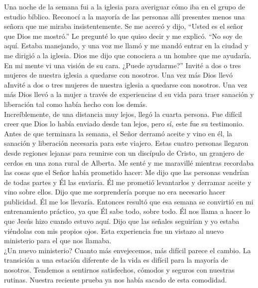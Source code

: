 \documentclass[twoside, 12pt]{book}
\begin{document}
Una noche de la semana fui a la iglesia para averiguar cómo iba en el grupo de estudio bíblico.  Reconocí a la mayoría de las personas allí presentes menos una señora que me miraba insistentemente. Se me acercó y dijo, “Usted es el señor que Dios me mostró.”  Le pregunté lo que quiso decir y me explicó. “No soy de aquí.  Estaba manejando, y una voz me llamó y me mandó entrar en la ciudad y me dirigió a la iglesia.  Dios me dijo que conociera a un hombre que me ayudaría. En mi mente vi una visión de su cara.  ¿Puede ayudarme?”
Invité a dos o tres mujeres de nuestra iglesia a quedarse con nosotros.  Una vez más Dios llevó aInvité a dos o tres mujeres de nuestra iglesia a quedarse con nosotros.  Una vez más Dios llevó a la mujer a través de experiencias d su vida para traer sanación y liberación tal como había hecho con los demás.\\

Increíblemente, de una distancia muy lejos, llegó la cuarta persona. Fue difícil creer que Dios lo había enviado desde tan lejos, pero sí, este fue su testimonio.  Antes de que terminara la semana, el Señor derramó aceite y vino en él, la sanación y liberación necesaria para este viajero.  Estas cuatro personas llegaron desde regiones lejanas para reunirse con un discípulo de Cristo, un granjero de cerdos en una zona rural de Alberta.
Me senté y me maravillé mientras recordaba las cosas que el Señor había prometido hacer: Me dijo que las personas vendrían de todas partes y Él las enviaría.  Él me prometió levantarlos y derramar aceite y vino sobre ellos.  Dijo que me sorprendería porque no era necesario hacer publicidad.  Él me los llevaría.  Entonces resultó que esa semana se convirtió en mi entrenamiento práctico, ya que Él sabe todo, sobre todo.  Él nos llama a hacer lo que Jesús hizo cuando estuvo aquí.  Dijo que las señales seguirían y yo estaba viéndolas con mis propios ojos.  Esta experiencia fue un vistazo al nuevo ministerio para el que nos llamaba.\\

¿Un nuevo ministerio? Cuanto más envejecemos, más difícil parece el cambio.  La transición a una estación diferente de la vida es difícil para la mayoría de nosotros.  Tendemos a sentirnos satisfechos, cómodos y seguros con nuestras rutinas.  Nuestra reciente prueba ya nos había sacado de esta comodidad.\\
\end{document}
